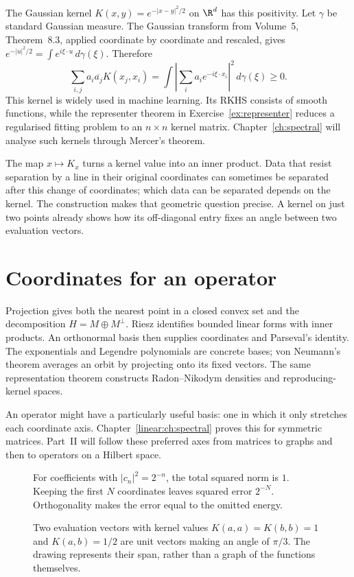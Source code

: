 The Gaussian kernel $K(x,y)=e^{-|x-y|^2/2}$ on $\R^d$ has this positivity. Let $\gamma$ be standard Gaussian measure. The Gaussian transform from Volume~5, Theorem~8.3, applied coordinate by coordinate and rescaled, gives $e^{-|u|^2/2}=\int e^{i\xi\cdot u}\,d\gamma(\xi)$. Therefore
\[\sum_{i,j}a_i\overline{a_j}K(x_j,x_i)=\int\left|\sum_ia_ie^{-i\xi\cdot x_i}\right|^2\,d\gamma(\xi)\ge0.\]
This kernel is widely used in machine learning. Its RKHS consists of smooth functions, while the representer theorem in Exercise~\ref{ex:representer} reduces a regularised fitting problem to an $n\times n$ kernel matrix. Chapter~\ref{ch:spectral} will analyse such kernels through Mercer's theorem.

\begin{beauty}
The map $x\mapsto K_x$ turns a kernel value into an inner product. Data that resist separation by a line in their original coordinates can sometimes be separated after this change of coordinates; which data can be separated depends on the kernel. The construction makes that geometric question precise. A kernel on just two points already shows how its off-diagonal entry fixes an angle between two evaluation vectors.
\end{beauty}

\section{Coordinates for an operator}

Projection gives both the nearest point in a closed convex set and the decomposition $H=M\oplus M^\perp$. Riesz identifies bounded linear forms with inner products. An orthonormal basis then supplies coordinates and Parseval's identity. The exponentials and Legendre polynomials are concrete bases; von Neumann's theorem averages an orbit by projecting onto its fixed vectors. The same representation theorem constructs Radon--Nikodym densities and reproducing-kernel spaces.

An operator might have a particularly useful basis: one in which it only stretches each coordinate axis. Chapter~\ref{linear:ch:spectral} proves this for symmetric matrices. Part~II will follow these preferred axes from matrices to graphs and then to operators on a Hilbert space.

\begin{figure}[ht]
\centering{}
\caption{For coefficients with $|c_n|^2=2^{-n}$, the total squared norm is $1$. Keeping the first $N$ coordinates leaves squared error $2^{-N}$. Orthogonality makes the error equal to the omitted energy.}\label{fig:v8c02tail}
\end{figure}
\begin{figure}[ht]
\centering{}
\caption{Two evaluation vectors with kernel values $K(a,a)=K(b,b)=1$ and $K(a,b)=1/2$ are unit vectors making an angle of $\pi/3$. The drawing represents their span, rather than a graph of the functions themselves.}\label{fig:v8c02kernel}
\end{figure}

